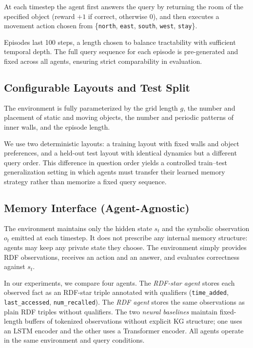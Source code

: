 \documentclass[runningheads]{llncs}
\begin{document}
At each timestep the agent first answers the query by returning the room of the
specified object (reward $+1$ if correct, otherwise $0$), and then executes a
movement action chosen from \{\texttt{north}, \texttt{east}, \texttt{south},
\texttt{west}, \texttt{stay}\}.

Episodes last 100 steps, a length chosen to balance tractability with sufficient temporal depth.
The full query sequence for each episode is pre-generated and fixed across all agents, ensuring strict comparability in evaluation.

\subsection{Configurable Layouts and Test Split}

The environment is fully parameterized by the grid length $g$, the number and
placement of static and moving objects, the number and periodic patterns of
inner walls, and the episode length.

We use two deterministic layouts: a training layout with fixed walls and object
preferences, and a held-out test layout with identical dynamics but a different
query order. This difference in question order yields a controlled train–test
generalization setting in which agents must transfer their learned memory
strategy rather than memorize a fixed query sequence.

\subsection{Memory Interface (Agent-Agnostic)}

The environment maintains only the hidden state $s_t$ and the symbolic
observation $o_t$ emitted at each timestep. It does not prescribe any internal
memory structure: agents may keep any private state they choose. The
environment simply provides RDF observations, receives an action and an answer,
and evaluates correctness against $s_t$.

In our experiments, we compare four agents. The \emph{RDF-star agent}
stores each observed fact as an RDF-star triple annotated with qualifiers
(\texttt{time\_added}, \texttt{last\_accessed}, \texttt{num\_recalled}). The
\emph{RDF agent} stores the same observations as plain RDF triples without
qualifiers. The two \emph{neural baselines} maintain fixed-length buffers of
tokenized observations without explicit KG structure; one uses an LSTM
encoder and the other uses a Transformer encoder. All agents operate in the same environment and query conditions.
\end{document}
